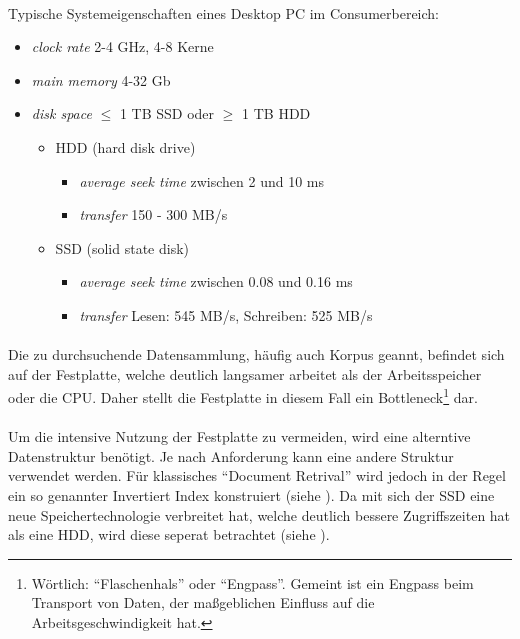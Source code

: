 \paragraph{}
Typische Systemeigenschaften eines Desktop PC im Consumerbereich:
\begin{itemize}
	\item \textit{clock rate} 2-4 GHz, 4-8 Kerne
	\item \textit{main memory} 4-32 Gb
	\item \textit{disk space} $\leq$ 1 TB SSD oder $\geq$ 1 TB HDD
	\begin{itemize}
	\item HDD (hard disk drive)
	\begin{itemize}
	\item \textit{average seek time} zwischen 2 und 10 ms
	\item \textit{transfer} 150 - 300 MB/s
	\end{itemize}
	\item SSD (solid state disk)
	\begin{itemize}
	\item \textit{average seek time} zwischen 0.08 und 0.16 ms
	\item \textit{transfer} Lesen: 545 MB/s, Schreiben: 525 MB/s
	\end{itemize}
	\end{itemize}
\end{itemize}	 
\par

\paragraph{}
Die zu durchsuchende Datensammlung, häufig auch Korpus geannt, befindet sich auf der Festplatte, welche deutlich langsamer arbeitet als der Arbeitsspeicher oder die CPU. Daher stellt die Festplatte in diesem Fall ein Bottleneck\footnote{Wörtlich: \enquote{Flaschenhals} oder \enquote{Engpass}. Gemeint ist ein Engpass beim Transport von Daten, der maßgeblichen Einfluss auf die Arbeitsgeschwindigkeit hat.} dar.
\par

\paragraph{}
Um die intensive Nutzung der Festplatte zu vermeiden, wird eine alterntive Datenstruktur benötigt. Je nach Anforderung kann eine andere Struktur verwendet werden. Für klassisches \enquote{Document Retrival} wird jedoch in der Regel ein so genannter Invertiert Index konstruiert (siehe ).
Da mit sich der SSD eine neue Speichertechnologie verbreitet hat, welche deutlich bessere Zugriffszeiten hat als eine HDD, wird diese seperat betrachtet (siehe ).
\par

